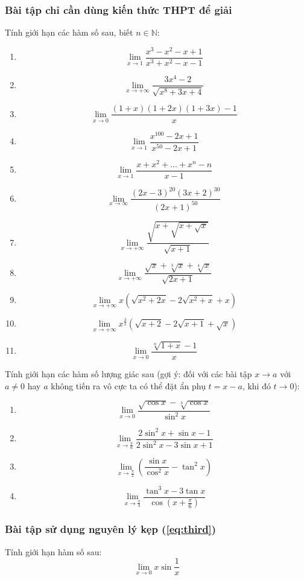 \subsubsection{Bài tập chỉ cần dùng kiến thức THPT để giải}
Tính giới hạn các hàm số sau, biết $n\in\mathbb{N}$:
\begin{enumerate}
    \item $$\lim_{x\to1}\frac{x^3-x^2-x+1}{x^3+x^2-x-1}$$
    \item $$\lim_{x\to+\infty}\frac{3x^4-2}{\sqrt{x^8+3x+4}}$$
    \item $$\lim_{x\to0}\frac{(1+x)(1+2x)(1+3x)-1}{x}$$
    \item $$\lim_{x\to1}\frac{x^{100}-2x+1}{x^{50}-2x+1}$$
    \item $$\lim_{x\to1}\frac{x+x^2+...+x^n-n}{x-1}$$
    \item $$\lim_{x\to\infty}\frac{(2x-3)^{20}(3x+2)^{30}}{(2x+1)^{50}}$$
    \item $$\lim_{x\to+\infty}\frac{\sqrt{x+\sqrt{x+\sqrt{x}}}}{\sqrt{x+1}}$$
    \item $$\lim_{x\to+\infty}\frac{\sqrt{x}+\sqrt[3]{x}+\sqrt[4]{x}}{\sqrt{2x+1}}$$
    \item $$\lim_{x\to+\infty}x(\sqrt{x^2+2x}-2\sqrt{x^2+x}+x)$$
    \item $$\lim_{x\to+\infty}x^\frac{3}{2}(\sqrt{x+2}-2\sqrt{x+1}+\sqrt{x})$$
    \item $$\lim_{x\to0}\frac{\sqrt[n]{1+x}-1}{x}$$
\end{enumerate}
Tính giới hạn các hàm số lượng giác sau (gợi ý: đối với các bài tập $x\to a$ với $a\ne 0$ hay $a$ không tiến ra vô cực ta có thể đặt ẩn phụ $t=x-a$, khi đó $t\to0$):
\begin{enumerate}
    \item $$\lim_{x\to0}\frac{\sqrt{\cos{x}}-\sqrt[3]{\cos{x}}}{\sin^2{x}}$$
    \item $$\lim_{x\to\frac{\pi}{6}}{\frac{2\sin^2{x}+\sin{x}-1}{2\sin^2{x}-3\sin{x}+1}}$$
    \item $$\lim_{x\to\frac{\pi}{2}}\left(\frac{\sin{x}}{\cos^2{x}}-\tan^2{x}\right)$$
    \item $$\lim_{x\to\frac{\pi}{3}}{\frac{\tan^3{x}-3\tan{x}}{\cos(x+\frac{\pi}{6})}}$$
\end{enumerate}
\subsubsection{Bài tập sử dụng nguyên lý kẹp (\ref{eq:third})}
Tính giới hạn hàm số sau:
$$\lim_{x\to0}x\sin{\frac{1}{x}}$$
